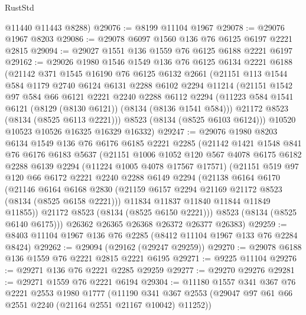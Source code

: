 \begin{lexlean}{RustStd}
\begin{coremodule}
{\begin{coremodule}
{{{{{{{{{{{{{{{{{{{{{{{{{{{{{{{{{{{{{{{{{{{{{{{{{{{{{      @11440
      @11443
      @8288)
@29076 := @8199 @11104 @1967
@29078 := @29076 @1967 @8203
@29086 := @29078 @6097 @1560 @136 @76 @6125 @6197 @2221 @2815
@29094 := @29027 @1551 @136 @1559 @76 @6125 @6188 @2221 @6197
@29162 := @29026
    @1980
    @1546
    @1549
    @136
    @76
    @6125
    @6134
    @2221
    @6188
    (@21142
      @371
      @1545
      @16190
      @76
      @6125
      @6132
      @2661
      (@21151
        @113
        @1544
        @584
        @1179
        @2740
        @6124
        @6131
        @2288
        @6102
        @2294
        @11214
        (@21151
          @1542
          @97
          @584
          @66
          @6121
          @2221
          @2240
          @2288
          @6112
          @2294
          (@11223 @584 @1541 @6121 (@8129 (@8130 @6121)) (@8134 (@8136 @1541 @584)))
          @21172
          @8523
          (@8134 (@8525 @6113 @2221)))
        @8523
        (@8134 (@8525 @6103 @6124)))
      @10520
      @10523
      @10526
      @16325
      @16329
      @16332)
@29247 := @29076
    @1980
    @8203
    @6134
    @1549
    @136
    @76
    @6176
    @6185
    @2221
    @2285
    (@21142
      @1421
      @1548
      @841
      @76
      @6176
      @6183
      @5637
      (@21151
        @1006
        @1052
        @120
        @567
        @4078
        @6175
        @6182
        @2288
        @6139
        @2294
        (@11224 @1005 @4078 @17567 @17571)
        (@21151
          @519
          @97
          @120
          @66
          @6172
          @2221
          @2240
          @2288
          @6149
          @2294
          (@21138
            @6164
            @6170
            (@21146
              @6164
              @6168
              @2830
              (@21159 @6157 @2294 @21169 @21172 @8523 (@8134 (@8525 @6158 @2221)))
              @11834
              @11837
              @11840
              @11844
              @11849
              @11855))
          @21172
          @8523
          (@8134 (@8525 @6150 @2221)))
        @8523
        (@8134 (@8525 @6140 @6175)))
      @26362
      @26365
      @26368
      @26372
      @26377
      @26383)
@29259 := @8403 @11104 @1967 @136 @76 @2285 (@8412 @11104 @1967 @133 @76 @2284 @8424)
@29262 := @29094 (@29162 (@29247 @29259))
@29270 := @29078 @6188 @136 @1559 @76 @2221 @2815 @2221 @6195
@29271 := @9225 @11104
@29276 := @29271 @136 @76 @2221 @2285 @29259
@29277 := @29270 @29276
@29281 := @29271 @1559 @76 @2221 @6194
@29304 := @11180
    @1557
    @341
    @367
    @76
    @2221
    @2553
    @1980
    @1777
    (@11190 @341 @367 @2553 (@29047 @97 @61 @66 @2551 @2240 (@21164 @2551 @21167 @10042) @11252))
}}}}}}}}}}}}}}}}}}}}}}}}}}}}}}}}}}}}}}}}}}}}}}}}}}}}}
\end{coremodule}}
\end{coremodule}
\end{lexlean}
